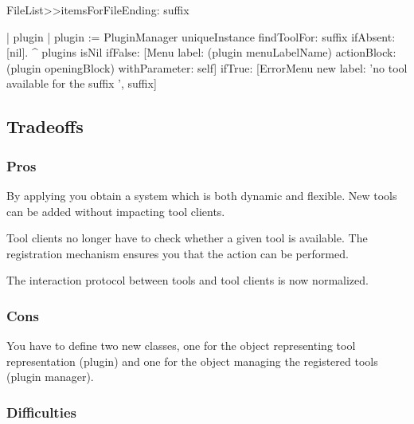 \documentclass[a4paper,10pt,twoside]{book}
\begin{document}
\begin{code}
FileList>>itemsForFileEnding: suffix
	
	| plugin |
	plugin := PluginManager uniqueInstance
							findToolFor: suffix ifAbsent: [nil].
	^ plugins isNil 
			ifFalse: [Menu label: (plugin menuLabelName)
									actionBlock: (plugin openingBlock)
									withParameter: self]
			ifTrue: [ErrorMenu new 
								label: 'no tool available for the suffix ', suffix]	
\end{code}

\subsection*{Tradeoffs}

\subsubsection*{Pros}

\begin{bulletlist}
\item By applying    you obtain a system which is both dynamic and flexible. New tools can be added without impacting tool clients.

\item Tool clients no longer have to check whether a given tool is available. The registration mechanism ensures you that the action can be performed.

\item The interaction protocol between tools and tool clients is now normalized.
\end{bulletlist}

\subsubsection*{Cons}

\begin{bulletlist}
\item You have to define two new classes, one for the object representing tool representation (plugin) and one for the object managing the registered tools (plugin manager). 
\end{bulletlist}

\subsubsection*{Difficulties}
\end{document}
